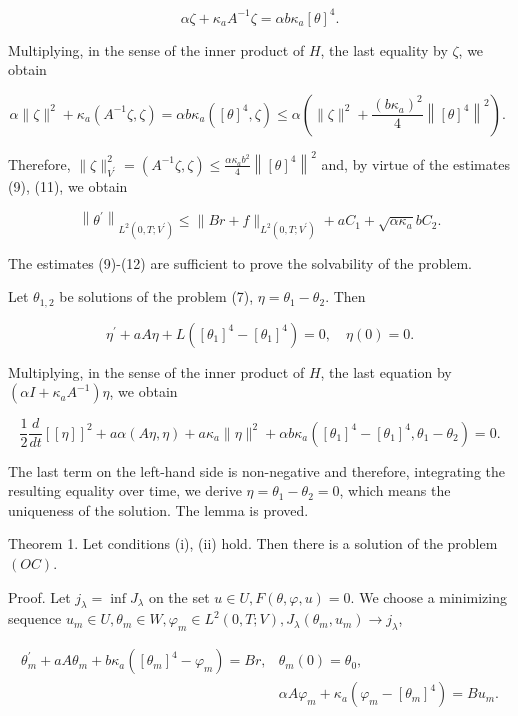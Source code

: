 $$
\alpha \zeta+\kappa_{a} A^{-1} \zeta=\alpha b \kappa_{a}[\theta]^{4} .
$$

Multiplying, in the sense of the inner product of $H$, the last equality by $\zeta$, we obtain

$$
\alpha\|\zeta\|^{2}+\kappa_{a}\left(A^{-1} \zeta, \zeta\right)=\alpha b \kappa_{a}\left([\theta]^{4}, \zeta\right) \leq \alpha\left(\|\zeta\|^{2}+\frac{\left(b \kappa_{a}\right)^{2}}{4}\left\|[\theta]^{4}\right\|^{2}\right) \text {. }
$$

Therefore, $\|\zeta\|_{V^{\prime}}^{2}=\left(A^{-1} \zeta, \zeta\right) \leq \frac{\alpha \kappa_{a} b^{2}}{4}\left\|[\theta]^{4}\right\|^{2}$ and, by virtue of the estimates (9), (11), we obtain

$$
\left\|\theta^{\prime}\right\|_{L^{2}\left(0, T ; V^{\prime}\right)} \leq\|B r+f\|_{L^{2}\left(0, T ; V^{\prime}\right)}+a C_{1}+\sqrt{\alpha \kappa_{a}} b C_{2} .
$$

The estimates (9)-(12) are sufficient to prove the solvability of the problem.

Let $\theta_{1,2}$ be solutions of the problem (7), $\eta=\theta_{1}-\theta_{2}$. Then

$$
\eta^{\prime}+a A \eta+L\left(\left[\theta_{1}\right]^{4}-\left[\theta_{1}\right]^{4}\right)=0, \quad \eta(0)=0 .
$$

Multiplying, in the sense of the inner product of $H$, the last equation by $\left(\alpha I+\kappa_{a} A^{-1}\right) \eta$, we obtain

$$
\frac{1}{2} \frac{d}{d t}[[\eta]]^{2}+a \alpha(A \eta, \eta)+a \kappa_{a}\|\eta\|^{2}+\alpha b \kappa_{a}\left(\left[\theta_{1}\right]^{4}-\left[\theta_{1}\right]^{4}, \theta_{1}-\theta_{2}\right)=0 .
$$

The last term on the left-hand side is non-negative and therefore, integrating the resulting equality over time, we derive $\eta=\theta_{1}-\theta_{2}=0$, which means the uniqueness of the solution. The lemma is proved.

Theorem 1. Let conditions (i), (ii) hold. Then there is a solution of the problem $(O C)$.

Proof. Let $j_{\lambda}=\inf J_{\lambda}$ on the set $u \in U, F(\theta, \varphi, u)=0$. We choose a minimizing sequence $u_{m} \in U, \theta_{m} \in W, \varphi_{m} \in L^{2}(0, T ; V), J_{\lambda}\left(\theta_{m}, u_{m}\right) \rightarrow j_{\lambda}$,

$$
\begin{aligned}
\theta_{m}^{\prime}+a A \theta_{m}+b \kappa_{a}\left(\left[\theta_{m}\right]^{4}-\varphi_{m}\right)=B r, & \theta_{m}(0)=\theta_{0}, \\
& \alpha A \varphi_{m}+\kappa_{a}\left(\varphi_{m}-\left[\theta_{m}\right]^{4}\right)=B u_{m} .
\end{aligned}
$$

